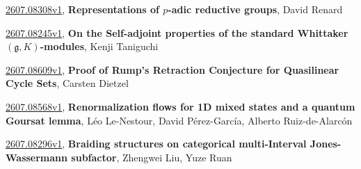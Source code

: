 \documentclass[9pt, a4paper]{article}
\theoremstyle{plain}
\theoremstyle{definition}
\theoremstyle{remark}
\newcommand{\arxiv}[3]{\href{https://arxiv.org/abs/#1}{#1}, \textbf{\textcolor{arxivblue}{#2}}, #3}
\begin{document}
\arxiv{2607.08308v1}{Representations of $p$-adic reductive groups}{David Renard}

\arxiv{2607.08245v1}{On the Self-adjoint properties of the standard Whittaker $(\mathfrak{g}, K)$-modules}{Kenji Taniguchi}

\arxiv{2607.08609v1}{Proof of Rump's Retraction Conjecture for Quasilinear Cycle Sets}{Carsten Dietzel}

\arxiv{2607.08568v1}{Renormalization flows for 1D mixed states and a quantum Goursat lemma}{Léo Le-Nestour, David Pérez-García, Alberto Ruiz-de-Alarcón}

\arxiv{2607.08296v1}{Braiding structures on categorical multi-Interval Jones-Wassermann subfactor}{Zhengwei Liu, Yuze Ruan}

\end{document}
